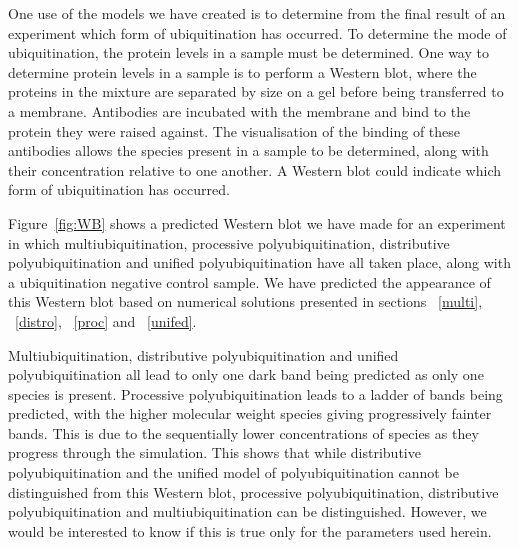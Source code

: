 \documentclass[11pt]{article}
\begin{document}
One use of the models we have created is to determine from the final result of an experiment which form of ubiquitination has occurred. To determine the mode of ubiquitination, the protein levels in a sample must be determined. One way to determine protein levels in a sample is to perform a Western blot, where the proteins in the mixture are separated by size on a gel before being transferred to a membrane. Antibodies are incubated with the membrane and bind to the protein they were raised against. The visualisation of the binding of these antibodies allows the species present in a sample to be determined, along with their concentration relative to one another. A Western blot could indicate which form of ubiquitination has occurred. 

Figure~\ref{fig:WB} shows a predicted Western blot we have made for an experiment in which multiubiquitination, processive polyubiquitination, distributive polyubiquitination and unified polyubiquitination have all taken place, along with a ubiquitination negative control sample. We have predicted the appearance of this Western blot based on numerical solutions presented in sections ~\ref{multi}, ~\ref{distro}, ~\ref{proc} and ~\ref{unifed}.

Multiubiquitination, distributive polyubiquitination and unified polyubiquitination all lead to only one dark band being predicted as only one species is present. Processive polyubiquitination leads to a ladder of bands being predicted, with the higher molecular weight species giving progressively fainter bands. This is due to the sequentially lower concentrations of species as they progress through the simulation. This shows that while distributive polyubiquitination and the unified model of polyubiquitination cannot be distinguished from this Western blot, processive polyubiquitination, distributive polyubiquitination and multiubiquitination can be distinguished. However, we would be interested to know if this is true only for the parameters used herein.
\end{document}
